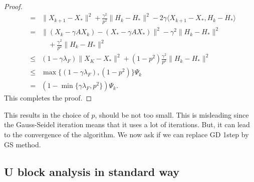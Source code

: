 \begin{itemize}
\begin{proof}
\begin{eqnarray}
&=& \|X_{k+1} - X_* \|^2 + \frac{\gamma^2}{p^2} \|H_k - H_*\|^2 - 
2 \gamma \langle X_{k+1} - X_*, H_k - H_* \rangle \\ 
&=& \|(X_k - \gamma A X_k) - (X_* - \gamma AX_*)\|^2 -  \gamma^2 \|H_k - H_*\|^2 \\
&& \quad + \frac{\gamma^2}{p^2} \|H_k - H_*\|^2 \\
&\leq& (1 - \gamma \lambda_F) \|X_K - X_*\|^2 + (1 - p^2) \frac{\gamma^2}{p^2} \|H_k - H_*\|^2 \\
&\leq& \max \{ (1 - \gamma \lambda_F), (1 - p^2) \} \Psi_k \\
&=& (1 - \min \{ \gamma \lambda_F, p^2 \} ) \Psi_k. 
\end{eqnarray}
This completes the proof. 
\end{proof} 
\begin{remark}
This results in the choice of $p$, should be not too small. This is misleading since the Gauss-Seidel iteration means that it uses a lot of iterations. But, it can lead to the convergence of the algorithm. We now ask if we can replace GD 1step by GS method. 
\end{remark} 

\subsection{U block analysis in standard way}


\end{itemize}
